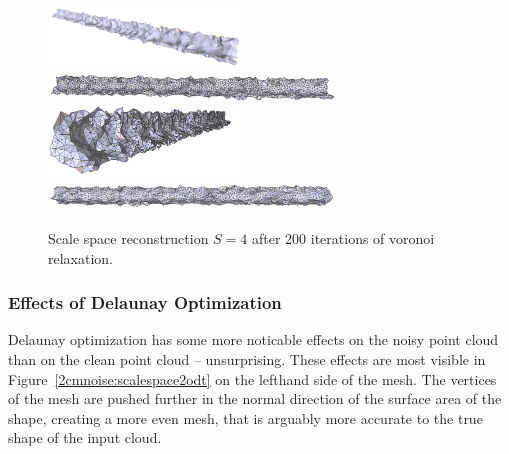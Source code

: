 \documentclass[12pt]{drexelthesis}
\let\Oldsubsubsection\subsubsection
\renewcommand{\subsubsection}{\FloatBarrier\Oldsubsubsection}
\begin{document}
\begin{figure}[!ht]
	\centering
		\includegraphics[width=2in]{simulated-lab-scan/2cmnoise/optimized/scalespace4lloyd00.png}
		\includegraphics[width=3in]{simulated-lab-scan/2cmnoise/optimized/scalespace4lloyd01.png}
		\includegraphics[width=2in]{simulated-lab-scan/2cmnoise/optimized/scalespace4lloyd02.png}
		\includegraphics[width=3in]{simulated-lab-scan/2cmnoise/optimized/scalespace4lloyd03.png}
		\caption[Scale space reconstruction $S = 4$ after 200 iterations of voronoi relaxation]{\centering Scale space reconstruction $S = 4$ after 200 iterations of voronoi relaxation.}
	\label{2cmnoise:scalespace4lloyd}
\end{figure}



\subsubsection{Effects of Delaunay Optimization}

Delaunay optimization has some more noticable effects on the noisy point cloud than on the clean point cloud -- unsurprising. These effects are most visible in Figure~\ref{2cmnoise:scalespace2odt} on the lefthand side of the mesh. The vertices of the mesh are pushed further in the normal direction of the surface area of the shape, creating a more even mesh, that is arguably more accurate to the true shape of the input cloud.
\end{document}
